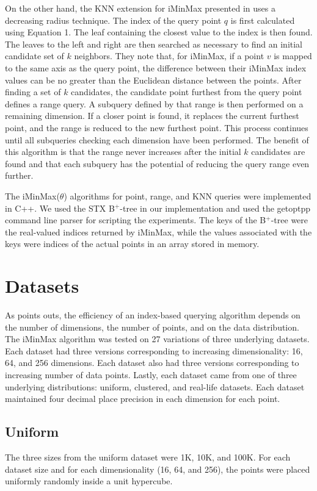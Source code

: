 \documentclass[conference]{IEEEtran}
\begin{document}
On the other hand, the KNN extension for iMinMax presented in \cite{iminmaxknn} uses a decreasing radius technique. The index of the query point $q$ is first calculated using Equation 1. The leaf containing the closest value to the index is then found. The leaves to the left and right are then searched as necessary to find an initial candidate set of $k$ neighbors. They note that, for iMinMax, if a point $v$ is mapped to the same axis as the query point, the difference between their iMinMax index values can be no greater than the Euclidean distance between the points. After finding a set of $k$ candidates, the candidate point furthest from the query point defines a range query. A subquery defined by that range is then performed on a remaining dimension. If a closer point is found, it replaces the current furthest point, and the range is reduced to the new furthest point. This process continues until all subqueries checking each dimension have been performed. The benefit of this algorithm is that the range never increases after the initial $k$ candidates are found and that each subquery has the potential of reducing the query range even further.

The iMinMax($\theta$) algorithms for point, range, and KNN queries were implemented in C++. We used the STX B$^+$-tree \cite{stx} in our implementation and used the getoptpp command line parser \cite{get_opt} for scripting the experiments. The keys of the B$^+$-tree were the real-valued indices returned by iMinMax, while the values associated with the keys were indices of the actual points in an array stored in memory.

\section{Datasets}
As \cite{Bohm:2000:CMQ:357775.357776} points outs, the efficiency of an index-based querying algorithm depends on the number of dimensions, the number of points, and on the data distribution. The iMinMax algorithm was tested on 27 variations of three underlying datasets. Each dataset had three versions corresponding to increasing dimensionality: 16, 64, and 256 dimensions. Each dataset also had three versions corresponding to increasing number of data points. Lastly, each dataset came from one of three underlying distributions: uniform, clustered, and real-life datasets. Each dataset maintained four decimal place precision in each dimension for each point.

\subsection{Uniform}
The three sizes from the uniform dataset were 1K, 10K, and 100K. For each dataset size and for each dimensionality (16, 64, and 256), the points were placed uniformly randomly inside a unit hypercube.
\end{document}
